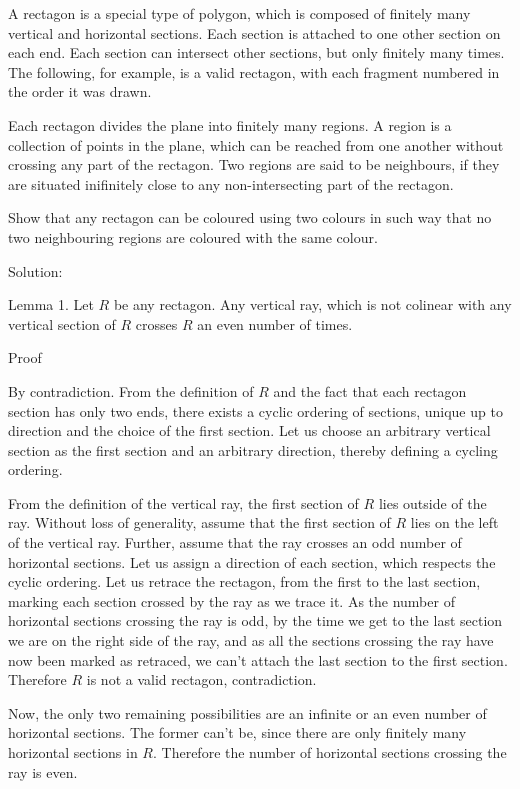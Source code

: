 A rectagon is a special type of polygon, which is composed of finitely many vertical and horizontal sections. Each section is attached to one other section on each end. Each section can intersect other sections, but only finitely many times. The following, for example, is a valid rectagon, with each fragment numbered in the order it was drawn.

Each rectagon divides the plane into finitely many regions. A region is a collection of points in the plane, which can be reached from one another without crossing any part of the rectagon. Two regions are said to be neighbours, if they are situated inifinitely close to any non-intersecting part of the rectagon.

Show that any rectagon can be coloured using two colours in such way that no two neighbouring regions are coloured with the same colour.

Solution:

Lemma 1. Let $R$ be any rectagon. Any vertical ray, which is not colinear with any vertical section of $R$ crosses $R$ an even number of times.

Proof

By contradiction. From the definition of $R$ and the fact that each rectagon section has only two ends, there exists a cyclic ordering of sections, unique up to direction and the choice of the first section. Let us choose an arbitrary vertical section as the first section and an arbitrary direction, thereby defining a cycling ordering.

From the definition of the vertical ray, the first section of $R$ lies outside of the ray. Without loss of generality, assume that the first section of $R$ lies on the left of the vertical ray. Further, assume that the ray crosses an odd number of horizontal sections. Let us assign a direction of each section, which respects the cyclic ordering. Let us retrace the rectagon, from the first to the last section, marking each section crossed by the ray as we trace it. As the number of horizontal sections crossing the ray is odd, by the time we get to the last section we are on the right side of the ray, and as all the sections crossing the ray have now been marked as retraced, we can't attach the last section to the first section. Therefore $R$ is not a valid rectagon, contradiction.

Now, the only two remaining possibilities are an infinite or an even number of horizontal sections. The former can't be, since there are only finitely many horizontal sections in $R$. Therefore the number of horizontal sections crossing the ray is even.

